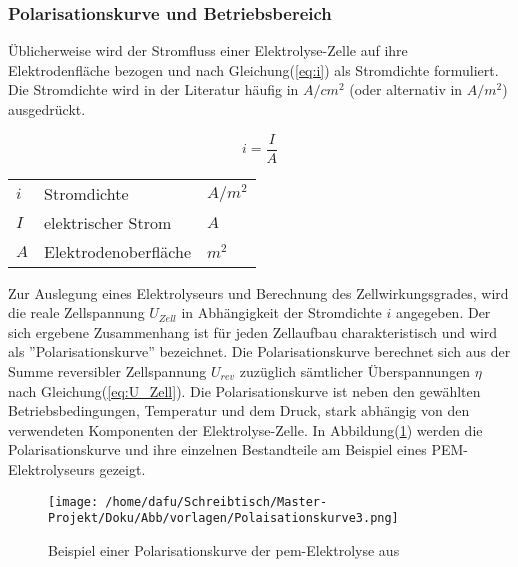 \documentclass[onecolumn,10pt,titlepage]{article}
\begin{document}
			\subsubsection{Polarisationskurve und Betriebsbereich}
			Üblicherweise wird der Stromfluss einer Elektrolyse-Zelle auf ihre Elektrodenfläche bezogen und nach Gleichung(\ref{eq:i}) als Stromdichte formuliert.\cite{Hey.26.Oktober2012} Die Stromdichte wird in der Literatur häufig in $A/cm^2$ (oder alternativ in $A/m^2$) ausgedrückt.
			
			\begin{equation}
				i=\frac{I}{A}
				\label{eq:i}
			\end{equation}
			
			\begin{table}[H]
				\begin{tabular*}{\textwidth}{lll}\\
					$i$&Stromdichte&$A/m^2$\\
					$I$&elektrischer Strom&$A$\\
					$A$&Elektrodenoberfläche&$m^2$\\
				\end{tabular*}
			\end{table}
			
			Zur Auslegung eines Elektrolyseurs und Berechnung des Zellwirkungsgrades, wird die reale Zellspannung $U_{Zell}$ in Abhängigkeit der Stromdichte $i$ angegeben.\cite{Tjarks.2017} Der sich ergebene Zusammenhang ist für jeden Zellaufbau charakteristisch und wird als ''Polarisationskurve'' bezeichnet. Die Polarisationskurve berechnet sich aus der Summe reversibler Zellspannung $U_{rev}$ zuzüglich sämtlicher Überspannungen $\eta$ nach Gleichung(\ref{eq:U_Zell}). Die Polarisationskurve ist neben den gewählten Betriebsbedingungen, Temperatur und dem Druck, stark abhängig von den verwendeten Komponenten der Elektrolyse-Zelle. In Abbildung(\ref{fig:polar_Grundlagen}) werden die Polarisationskurve und ihre einzelnen Bestandteile am Beispiel eines PEM-Elektrolyseurs gezeigt.
			
			\begin{figure}[H]
				\centering
				
				\texttt{[image: /home/dafu/Schreibtisch/Master-Projekt/Doku/Abb/vorlagen/Polaisationskurve3.png]}
				\caption[Beispiel einer PEM-Polarisationskurve]{Beispiel einer Polarisationskurve der \gls{pem}-Elektrolyse aus \cite{Abdin.2017}}
				\label{fig:polar_Grundlagen} 
			\end{figure}
			
\end{document}
